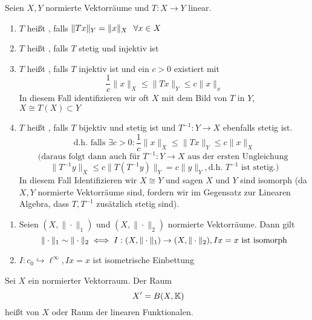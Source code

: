 \begin{definition}
	Seien $X, Y$ normierte Vektorräume und $T: X \rightarrow Y$ linear.
	\begin{enumerate}[label=\alph*\upshape)]

		\item $T$ hei{\ss}t , falls $ \| Tx \|_{Y} = \| x \|_{X} \hspace{0.25cm} \forall x \in X $
		\item $T$ hei{\ss}t , falls $T$ stetig und injektiv ist
		\item $T$ hei{\ss}t , falls $T$ injektiv ist und ein $c > 0$ existiert mit
			\[ \frac{1}{c} \| x \|_{X} \leq \| Tx \|_{Y} \leq c \| x \|_{x} \]
			In diesem Fall identifizieren wir oft $X$ mit dem Bild von $T$ in $Y$, $X \cong T(X) \subset Y$ 
		\item $T$ hei{\ss}t , falls $T$ bijektiv und stetig ist und $T^{-1}: Y \rightarrow X$ ebenfalls stetig ist. 
			\[ \text{d.h. falls } \exists c > 0: \frac{1}{c} \| x \|_{X} \leq \| T x \|_{Y} \leq c \| x \|_{X} \]
			\[ \text{(daraus folgt dann auch für }T^{-1}: Y \rightarrow X \text{ aus der ersten Ungleichung } \]
			\[ \| T^{-1}y \|_{X} \leq c \| T (T^{-1}y) \|_{Y} = c \| y \|_{Y}, \text{d.h. } T^{-1} \text{ ist stetig.)}\]
			In diesem Fall Identifizieren wir $X \cong Y$ und sagen $X$ und $Y$ sind isomorph (da $X, Y$ normierte Vektorräume sind, fordern wir im Gegensatz zur Linearen Algebra, dass $T, T^{-1}$ zusätzlich stetig sind).
	\end{enumerate}
\end{definition}


\begin{beispiel}
	\begin{enumerate}[label=\alph*\upshape)]
		\item Seien $(X, \| \cdot \|_{1})$ und $(X, \| \cdot \|_{2})$ normierte Vektorräume. Dann gilt
			\[ \| \cdot \|_{1} \sim \| \cdot \|_{2} \iff I: (X, \| \cdot \|_{1}) \rightarrow (X, \| \cdot \|_{2}), Ix = x \text{ ist isomorph} \]
		\item $I: c_{0} \hookrightarrow \ell^{\infty}, I x = x$ ist isometrische Einbettung
	\end{enumerate}
\end{beispiel}


\begin{definition}	
	Sei $X$ ein normierter Vektorraum. Der Raum
 		\[ X' = B(X, \MdK) \]	
 	hei{\ss}t  von $X$ oder Raum der linearen Funktionalen.
\end{definition}

